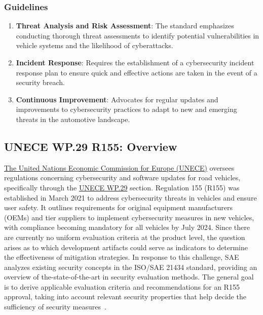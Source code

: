 \subsubsection{Guidelines}\label{subsubsec:guidelines}
\begin{enumerate}
    \item \textbf{Threat Analysis and Risk Assessment}: The standard emphasizes conducting thorough threat assessments to identify potential vulnerabilities in vehicle systems and the likelihood of cyberattacks.
    \item \textbf{Incident Response}: Requires the establishment of a cybersecurity incident response plan to ensure quick and effective actions are taken in the event of a security breach.
    \item \textbf{Continuous Improvement}: Advocates for regular updates and improvements to cybersecurity practices to adapt to new and emerging threats in the automotive landscape.
\end{enumerate}

\subsection{UNECE WP.29 R155: Overview}\label{subsec:unece-wp-29-r155}

\href{https://unece.org/}{The United Nations Economic Commission for Europe (UNECE)} oversees regulations concerning cybersecurity and software updates for road vehicles, specifically through the
\href{https://unece.org/wp29-introduction}{UNECE WP.29} section.
Regulation 155 (R155) was established in March 2021 to address cybersecurity threats in vehicles and ensure user safety.
It outlines requirements for original equipment manufacturers (OEMs) and tier suppliers to implement cybersecurity measures in new vehicles,
with compliance becoming mandatory for all vehicles by July 2024.
Since there are currently no uniform evaluation criteria at the product level, the question arises as to which development artifacts could serve as indicators to determine the effectiveness of mitigation strategies.
In response to this challenge, SAE analyzes existing security concepts in the ISO/SAE 21434 standard, providing an overview of the-state-of-the-art in security evaluation methods.
The general goal is to derive applicable evaluation criteria and recommendations for an R155 approval,
taking into account relevant security properties that help decide the sufficiency of security measures~\cite{hellstern2024cybersecurity}.

